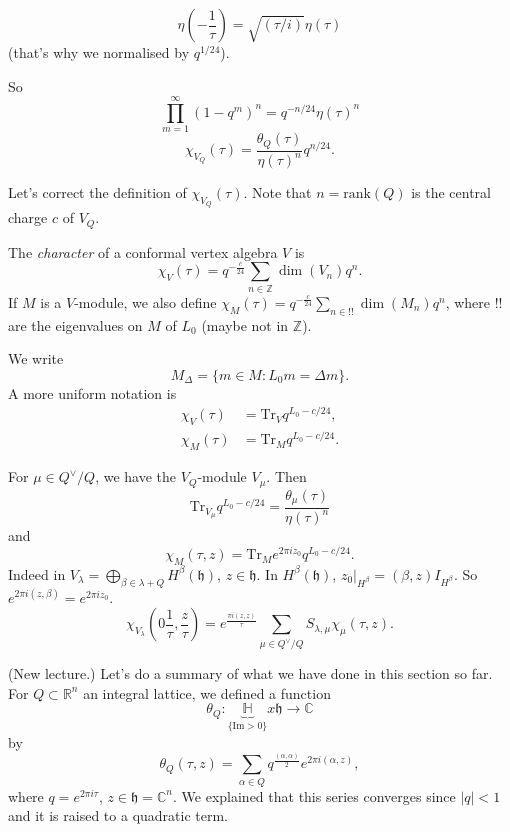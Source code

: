\begin{lemma}
\label{lemma-}
$$
\eta\left(-\frac{1}{\tau}\right)
=\sqrt{(\tau/i)}\eta(\tau)
$$
(that's why we normalised by $q^{1/24}$).
\end{lemma}

\noindent
So
$$
\prod_{m=1}^\infty (1-q^m)^n
=q^{-n/24}\eta(\tau)^n
$$
$$
\chi_{V_Q}(\tau)=\frac{\theta_Q(\tau)}{\eta(\tau)^n}q^{n/24}.
$$

Let's correct the definition of $\chi_{V_Q}(\tau)$.
Note that $n=\text{rank}(Q)$ is the central charge $c$ of $V_Q$.

\begin{definition}
\label{definition-character-of-conformal-vertex-algebra}
The {\it character} of a conformal vertex algebra $V$ is
$$
\chi_V(\tau)=q^{-\frac{c}{24}}\sum_{n \in \mathbb{Z}}\dim(V_n)q^n.
$$
If $M$ is a $V$-module,
we also define $\chi_M(\tau)=q^{-\frac{c}{24}}\sum_{n\in!!}\dim(M_n)q^n$,
where $!!$ are the eigenvalues on $M$ of $L_0$ (maybe not in $\mathbb{Z}$).

We write
$$
M_\Delta=\{m \in M:L_0m=\Delta m\}.
$$
A more uniform notation is
\begin{align*}
\chi_V(\tau)&=\text{Tr}_Vq^{L_0-c/24},\\
\chi_M(\tau)&=\text{Tr}_Mq^{L_0-c/24}.
\end{align*}
\end{definition}

\begin{lemma}
\label{lemma-character-v-modules}
For $\mu \in Q^\vee/Q$, we have the $V_Q$-module $V_\mu$.
Then
$$
\text{Tr}_{V_\mu}q^{L_0-c/24}=\frac{\theta_\mu(\tau)}{\eta(\tau)^n}
$$
and
$$
\boxed{\chi_M(\tau,z)=\text{Tr}_Me^{2\pi iz_0}q^{L_0-c/24}.}
$$
Indeed in $V_\lambda=\bigoplus_{\beta\in\lambda+Q}H^\beta(\mathfrak{h})$,
$z \in \mathfrak{h}$. In $H^\beta(\mathfrak{h})$,
$z_0|_{H^\beta}=(\beta,z)I_{H^\beta}$.
So $e^{2\pi i(z,\beta)}=e^{2\pi i z_0}$.
$$
\chi_{V_\lambda}\left(0\frac{1}{\tau},\frac{z}{\tau}\right)
=e^{\frac{\pi i(z,z)}{\tau}}
\sum_{\mu \in Q^\vee/Q}S_{\lambda,\mu}\chi_\mu(\tau,z).
$$
\end{lemma}




\medskip\noindent
(New lecture.) Let's do a summary of what we have done
in this section so far.
For $Q \subset \mathbb{R}^n$ an integral lattice,
we defined a function
$$
\theta_Q:\underbrace{\mathbb{H}}_{\{\text{Im}>0\}}x \mathfrak{h} \to \mathbb{C}
$$
by
$$
\theta_Q(\tau,z)=\sum_{\alpha \in Q}q^{\frac{(\alpha,\alpha)}{2}}
e^{2\pi i(\alpha,z)},
$$
where $q=e^{2\pi i \tau}$, $z \in \mathfrak{h}=\mathbb{C}^n$.
We explained that this series converges since $|q|<1$ and it
is raised to a quadratic term.

